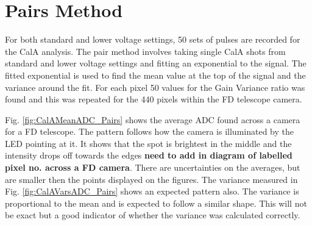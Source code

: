 \section{Pairs Method}

For both standard and lower voltage settings, 50 sets of pulses are recorded for the CalA analysis. The pair method involves taking single CalA shots from standard and lower voltage settings and fitting an exponential to the signal. The fitted exponential is used to find the mean value at the top of the signal and the variance around the fit. For each pixel 50 values for the Gain Variance ratio was found and this was repeated for the 440 pixels within the FD telescope camera.

Fig. \ref{fig:CalAMeanADC_Pairs} shows the average ADC found across a camera for a FD telescope. The pattern follows how the camera is illuminated by the LED pointing at it. It shows that the spot is brightest in the middle and the intensity drops off towards the edges \textbf{need to add in diagram of labelled pixel no. across a FD camera}. There are uncertainties on the averages, but are smaller then the points displayed on the figures. The variance measured in Fig. \ref{fig:CalAVarsADC_Pairs} shows an expected pattern also. The variance is proportional to the mean and is expected to follow a similar shape. This will not be exact but a good indicator of whether the variance was calculated correctly.

